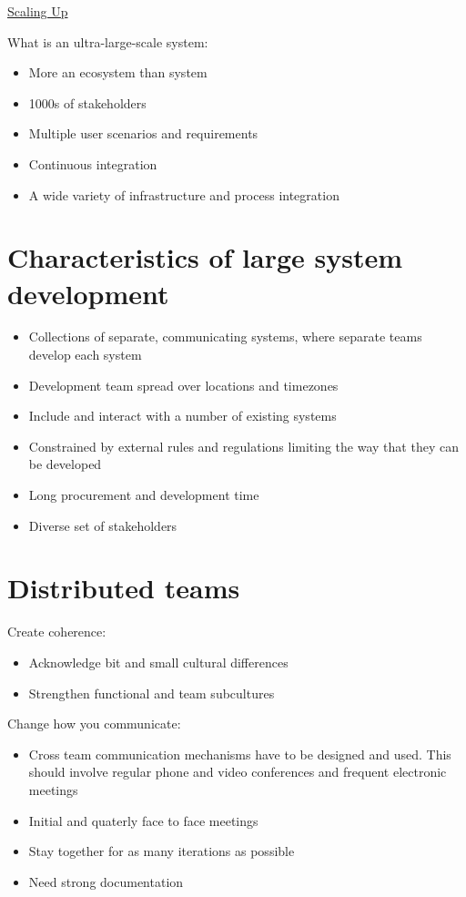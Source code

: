\documentclass{article}[18pt]
\begin{document}
\begin{center}
\underline{\huge Scaling Up}
\end{center}
What is an ultra-large-scale system:
\begin{itemize}
	\item More an ecosystem than system
	\item 1000s of stakeholders
	\item Multiple user scenarios and requirements
	\item Continuous integration
	\item A wide variety of infrastructure and process integration
\end{itemize}
\section{Characteristics of large system development}
\begin{itemize}
	\item Collections of separate, communicating systems, where separate teams develop each system
	\item Development team spread over locations and timezones
	\item Include and interact with a number of existing systems
	\item Constrained by external rules and regulations limiting the way that they can be developed
	\item Long procurement and development time
	\item Diverse set of stakeholders
\end{itemize}
\section{Distributed teams}
Create coherence:
\begin{itemize}
	\item Acknowledge bit and small cultural differences
	\item Strengthen functional and team subcultures
\end{itemize}
Change how you communicate:
\begin{itemize}
	\item Cross team communication mechanisms have to be designed and used. This should involve regular phone and video conferences and frequent electronic meetings
	\item Initial and quaterly face to face meetings
	\item Stay together for as many iterations as possible
	\item Need strong documentation
\end{itemize}
\end{document}
